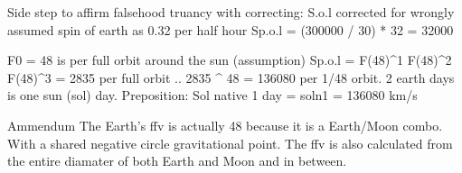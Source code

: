 Side step to affirm falsehood truancy with correcting:
S.o.l corrected for wrongly assumed spin of earth as 0.32 per half hour
Sp.o.l = (300000 / 30) * 32 = 32000

F0 = 48 is per full orbit around the sun (assumption)
Sp.o.l = F(48)^1 F(48)^2 F(48)^3 = 2835 per full orbit 
.. 2835 ^ 48 = 136080 per 1/48 orbit. 2 earth days is one sun (sol) day.
Preposition: Sol native 1 day = soln1 = 136080 km/s   

Ammendum
The Earth's ffv is actually 48 because it is a Earth/Moon combo. With a shared negative circle gravitational point.
The ffv is also calculated from the entire diamater of both Earth and Moon and in between. 



